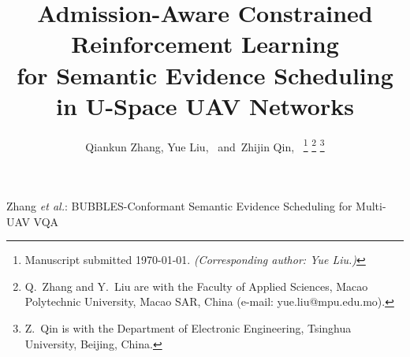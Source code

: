 \documentclass[journal]{IEEEtran}
\begin{document}
\title{Admission-Aware Constrained Reinforcement Learning\\
for Semantic Evidence Scheduling\\
in U-Space UAV Networks}

\author{Qiankun Zhang,
        Yue Liu,~
        and~Zhijin Qin,~
\thanks{Manuscript submitted \today. \emph{(Corresponding author: Yue Liu.)}}
\thanks{Q.\ Zhang and Y.\ Liu are with the Faculty of Applied Sciences,
Macao Polytechnic University, Macao SAR, China
(e-mail: yue.liu@mpu.edu.mo).}
\thanks{Z.\ Qin is with the Department of Electronic Engineering, Tsinghua
University, Beijing, China.}}

%
{Zhang \MakeLowercase{\textit{et al.}}: BUBBLES-Conformant Semantic Evidence Scheduling for Multi-UAV VQA}

\maketitle
\end{document}
